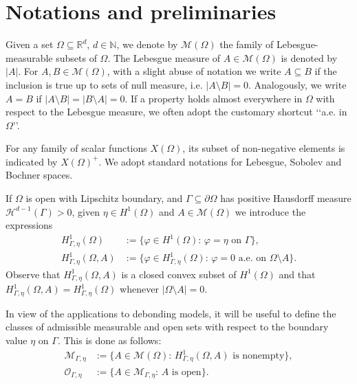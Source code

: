 \documentclass[a4paper,11pt,reqno]{amsart}
\numberwithin{equation}{section}
\theoremstyle{definition}
\theoremstyle{remark}
\renewcommand{\r}{\mathbb{R}}
\newcommand{\n}{\mathbb{N}}
\begin{document}
\renewcommand{\theequation}{\thesection.\arabic{equation}}
\section{Notations and preliminaries}\label{sec:preliminaries} 

 Given a set $\Omega\subseteq \r^d$, $d\in \n$, we denote by $\mathcal M(\Omega)$ the family of Lebesgue-measurable subsets of $\Omega$. The Lebesgue measure of $A\in \mathcal M(\Omega)$ is denoted by $|A|$. For $A,B\in \mathcal M(\Omega)$, with a slight abuse of notation we write $A\subseteq B$ if the inclusion is true up to sets of null measure, i.e. $|A\setminus B|=0$. Analogously, we write $A=B$ if $|A\setminus B|=|B\setminus A|=0$. If a property holds almost everywhere in $\Omega$ with respect to the Lebesgue measure, we often adopt the customary shortcut \lq\lq a.e. in $\Omega$\rq\rq.
 
 For any family of scalar functions $X(\Omega)$, its subset of non-negative elements is indicated by $X(\Omega)^+$. We adopt standard notations for Lebesgue, Sobolev and Bochner spaces.
 
 If $\Omega$ is open with Lipschitz boundary, and $\Gamma \subseteq \partial \Omega$ has positive Hausdorff measure $\mathcal{H}^{d-1}(\Gamma) > 0$, given $\eta\in H^1(\Omega)$ and $A\in \mathcal M(\Omega)$ we introduce the expressions
 \begin{align}
 H^1_{\Gamma,\eta}(\Omega)&:=\{\varphi\in H^1(\Omega):\, \varphi=\eta \text{ on }\Gamma \},\\
     H^1_{\Gamma,\eta}(\Omega,A)&:=\{\varphi\in H^1_{\Gamma,\eta}(\Omega):\, \varphi=0 \text{ a.e. on }\Omega\setminus A\}.
 \end{align}
Observe that $H^1_{\Gamma,\eta}(\Omega,A)$ is a closed convex subset of $H^1(\Omega)$ and that $H^1_{\Gamma,\eta}(\Omega,A)=H^1_{\Gamma,\eta}(\Omega)$ whenever $|\Omega\setminus A|=0$.
 
 In view of the applications to debonding models, it will be useful to define the classes of admissible measurable and open sets with respect to the boundary value $\eta$ on $\Gamma$. This is done as follows:
 \begin{align}
     \mathcal M_{\Gamma,\eta}&:=\{A\in \mathcal M(\Omega):\,  H^1_{\Gamma,\eta}(\Omega,A)\text{ is nonempty}\},\\
     \mathcal O_{\Gamma,\eta}&:=\{A\in \mathcal M_{\Gamma,\eta}:\, A\text{ is open}\}.
 \end{align}
\end{document}
